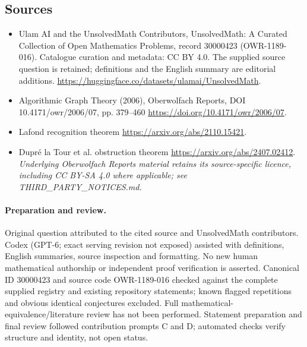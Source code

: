\documentclass[11pt]{article}
\begin{document}
\subsection{Sources}
\begin{itemize}
\item[\hypertarget{source:30000423:1}{S1}] Ulam AI and the UnsolvedMath Contributors, UnsolvedMath: A Curated Collection of Open Mathematics Problems, record 30000423 (OWR-1189-016). Catalogue curation and metadata: CC BY 4.0. The supplied source question is retained; definitions and the English summary are editorial additions.
\url{https://huggingface.co/datasets/ulamai/UnsolvedMath}.
\item[\hypertarget{source:30000423:2}{S2}] Algorithmic Graph Theory (2006), Oberwolfach Reports, DOI 10.4171/owr/2006/07, pp. 379--460
\url{https://doi.org/10.4171/owr/2006/07}.
\item[\hypertarget{source:30000423:3}{S3}] Lafond recognition theorem
\url{https://arxiv.org/abs/2110.15421}.
\item[\hypertarget{source:30000423:4}{S4}] Dupré la Tour et al. obstruction theorem
\url{https://arxiv.org/abs/2407.02412}.
\textit{Underlying Oberwolfach Reports material retains its source-specific licence, including CC BY-SA 4.0 where applicable; see THIRD\_PARTY\_NOTICES.md.}
\end{itemize}
\paragraph{Preparation and review.}
Original question attributed to the cited source and UnsolvedMath contributors. Codex (GPT-6; exact serving revision not exposed) assisted with definitions, English summaries, source inspection and formatting. No new human mathematical authorship or independent proof verification is asserted. Canonical ID 30000423 and source code OWR-1189-016 checked against the complete supplied registry and existing repository statements; known flagged repetitions and obvious identical conjectures excluded. Full mathematical-equivalence/literature review has not been performed. Statement preparation and final review followed contribution prompts C and D; automated checks verify structure and identity, not open status.
\label{end:30000423}
\end{document}
